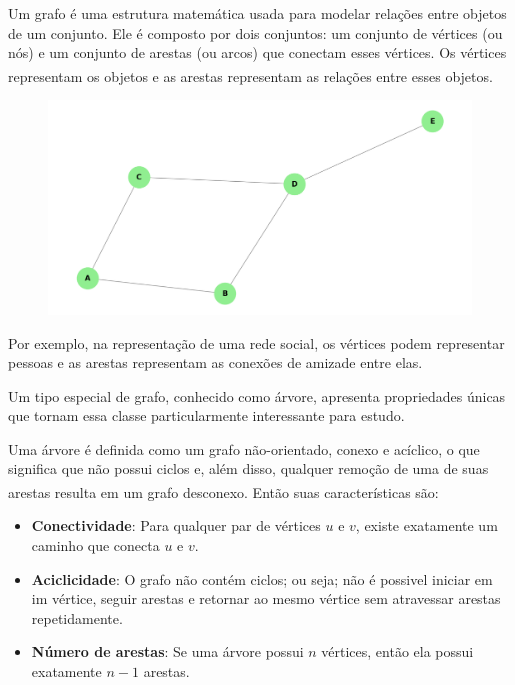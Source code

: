 \documentclass[12pt, a4paper]{scrreprt}
\begin{document}
Um grafo é uma estrutura matemática usada para modelar relações entre objetos de um conjunto. Ele é composto por dois conjuntos: um conjunto de vértices (ou nós) e um conjunto de arestas (ou arcos) que conectam esses vértices. Os vértices representam os objetos e as arestas representam as relações entre esses objetos. \textsuperscript{\cite{emilio2024grafos}}

\begin{figure}[h]
    \centering
    \includegraphics[width=.75\textwidth]{src/exemplo_simples_grafo.png}
    \label{fig:exemplo de grafo simples}
\end{figure}

Por exemplo, na representação de uma rede social, os vértices podem representar pessoas e as arestas representam as conexões de amizade entre elas.

Um tipo especial de grafo, conhecido como árvore, apresenta propriedades únicas que tornam essa classe particularmente interessante para estudo.

Uma árvore é definida como um grafo não-orientado, conexo e acíclico, o que significa que não possui ciclos e, além disso, qualquer remoção de uma de suas arestas resulta em um grafo desconexo.\textsuperscript{\cite{definicaoarvore}} Então suas características são:

\begin{itemize}
        \item \textbf{Conectividade}: Para qualquer par de vértices \( u \) e \( v \), existe exatamente um caminho que conecta \( u \) e \( v \).
        \item \textbf{Aciclicidade}: O grafo não contém ciclos; ou seja; não é possivel iniciar em im vértice, seguir arestas e retornar ao mesmo vértice sem atravessar arestas repetidamente.
        \item \textbf{Número de arestas}: Se uma árvore possui \( n \) vértices, então ela possui exatamente \( n - 1 \) arestas.
\end{itemize}
\end{document}
